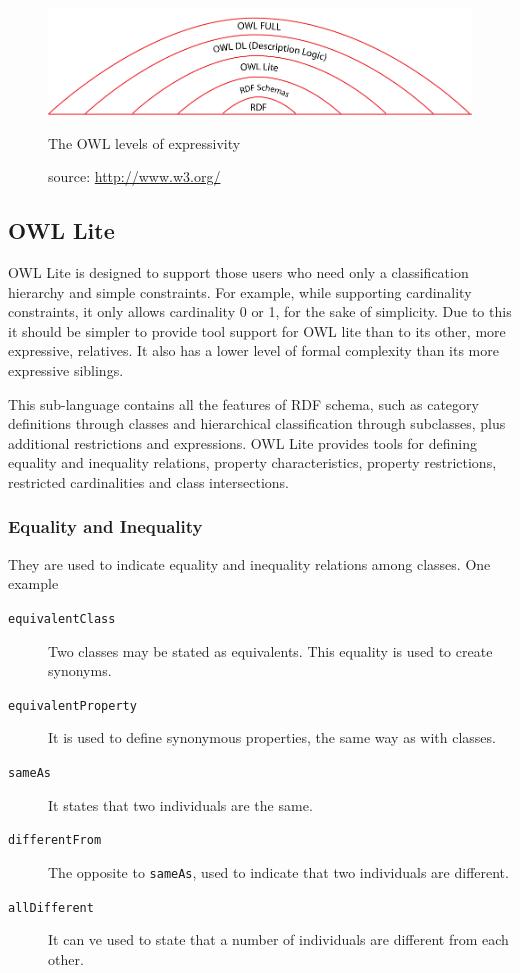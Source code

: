 \begin{figure}[h]
  \centering
  \includegraphics[width=.7\textwidth]{fig/owl-stack}
  \caption{The OWL levels of expressivity}
  \caption*{source: \url{http://www.w3.org/}}
  \label{fig:owlstack}
\end{figure} 


\subsection*{OWL Lite}

OWL Lite is designed to support those users who need only a classification hierarchy and simple constraints. For example, while supporting cardinality constraints, it only allows cardinality 0 or 1, for the sake of simplicity. Due to this it should be simpler to provide tool support for OWL lite than to its other, more expressive, relatives. It also has a lower level of formal complexity than its more expressive siblings.

This sub-language contains all the features of RDF schema, such as category definitions through classes and hierarchical classification through subclasses, plus additional restrictions and expressions. OWL Lite provides tools for defining equality and inequality relations, property characteristics, property restrictions, restricted cardinalities and class intersections.

\subsubsection*{Equality and Inequality}

They are used to indicate equality and inequality relations among classes. One example

\begin{description}
\item[\texttt{equivalentClass}] Two classes may be stated as equivalents. This equality is used to create synonyms.

\item[\texttt{equivalentProperty}] It is used to define synonymous properties, the same way as with classes.

\item[\texttt{sameAs}] It states that two individuals are the same.

\item[\texttt{differentFrom}] The opposite to \texttt{sameAs}, used to indicate that two individuals are different. 

\item[\texttt{allDifferent}] It can ve used to state that a number of individuals are different from each other.
\end{description}

